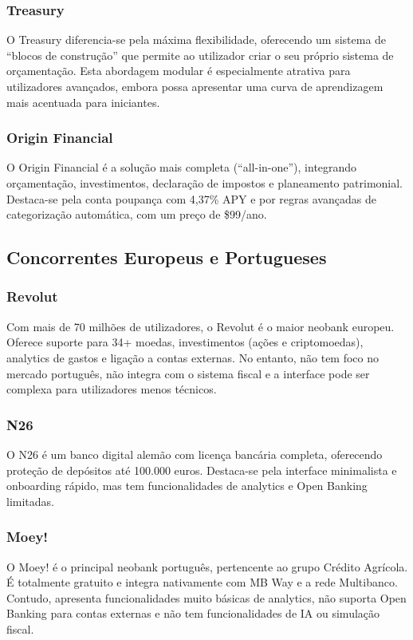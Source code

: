 \subsubsection{Treasury}
O Treasury diferencia-se pela máxima flexibilidade, oferecendo um sistema de ``blocos de construção'' que permite ao utilizador criar o seu próprio sistema de orçamentação. Esta abordagem modular é especialmente atrativa para utilizadores avançados, embora possa apresentar uma curva de aprendizagem mais acentuada para iniciantes.

\subsubsection{Origin Financial}
O Origin Financial é a solução mais completa (``all-in-one''), integrando orçamentação, investimentos, declaração de impostos e planeamento patrimonial. Destaca-se pela conta poupança com 4,37\% APY e por regras avançadas de categorização automática, com um preço de \$99/ano.


\subsection{Concorrentes Europeus e Portugueses}

\subsubsection{Revolut}
Com mais de 70 milhões de utilizadores, o Revolut é o maior neobank europeu. Oferece suporte para 34+ moedas, investimentos (ações e criptomoedas), analytics de gastos e ligação a contas externas. No entanto, não tem foco no mercado português, não integra com o sistema fiscal e a interface pode ser complexa para utilizadores menos técnicos.

\subsubsection{N26}
O N26 é um banco digital alemão com licença bancária completa, oferecendo proteção de depósitos até 100.000 euros. Destaca-se pela interface minimalista e onboarding rápido, mas tem funcionalidades de analytics e Open Banking limitadas.

\subsubsection{Moey!}
O Moey! é o principal neobank português, pertencente ao grupo Crédito Agrícola. É totalmente gratuito e integra nativamente com MB Way e a rede Multibanco. Contudo, apresenta funcionalidades muito básicas de analytics, não suporta Open Banking para contas externas e não tem funcionalidades de \ac{IA} ou simulação fiscal.


